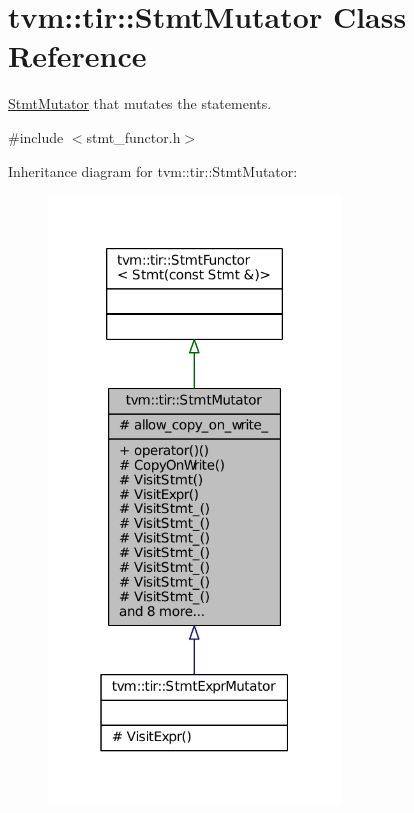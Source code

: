 \hypertarget{classtvm_1_1tir_1_1StmtMutator}{}\section{tvm\+:\+:tir\+:\+:Stmt\+Mutator Class Reference}
\label{classtvm_1_1tir_1_1StmtMutator}


\hyperlink{classtvm_1_1tir_1_1StmtMutator}{Stmt\+Mutator} that mutates the statements.  




{\ttfamily \#include $<$stmt\+\_\+functor.\+h$>$}



Inheritance diagram for tvm\+:\+:tir\+:\+:Stmt\+Mutator\+:
\nopagebreak
\begin{figure}[H]
\begin{center}
\leavevmode
\includegraphics[width=220pt]{classtvm_1_1tir_1_1StmtMutator__inherit__graph}
\end{center}
\end{figure}


